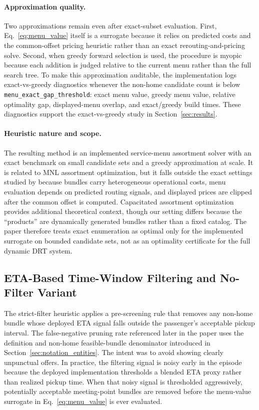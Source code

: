 \paragraph{Approximation quality.} Two approximations remain even after exact-subset evaluation. First, Eq.~\ref{eq:menu_value} itself is a surrogate because it relies on predicted costs and the common-offset pricing heuristic rather than an exact rerouting-and-pricing solve. Second, when greedy forward selection is used, the procedure is myopic because each addition is judged relative to the current menu rather than the full search tree. To make this approximation auditable, the implementation logs exact-vs-greedy diagnostics whenever the non-home candidate count is below \texttt{menu\_exact\_gap\_threshold}: exact menu value, greedy menu value, relative optimality gap, displayed-menu overlap, and exact/greedy build times. These diagnostics support the exact-vs-greedy study in Section~\ref{sec:results}.

\paragraph{Heuristic nature and scope.} The resulting method is an implemented service-menu assortment solver with an exact benchmark on small candidate sets and a greedy approximation at scale. It is related to MNL assortment optimization, but it falls outside the exact settings studied by \citet{wang2012} because bundles carry heterogeneous operational costs, menu evaluation depends on predicted routing signals, and displayed prices are clipped after the common offset is computed. Capacitated assortment optimization \citep{desir2022capacitated} provides additional theoretical context, though our setting differs because the ``products'' are dynamically generated bundles rather than a fixed catalog. The paper therefore treats exact enumeration as optimal only for the implemented surrogate on bounded candidate sets, not as an optimality certificate for the full dynamic DRT system.

\subsection{ETA-Based Time-Window Filtering and No-Filter Variant}
\label{sec:filtering}

The strict-filter heuristic applies a pre-screening rule that removes any non-home bundle whose deployed ETA signal falls outside the passenger's acceptable pickup interval. The false-negative pruning rate referenced later in the paper uses the definition and non-home feasible-bundle denominator introduced in Section~\ref{sec:notation_entities}. The intent was to avoid showing clearly unpunctual offers. In practice, the filtering signal is noisy early in the episode because the deployed implementation thresholds a blended ETA proxy rather than realized pickup time. When that noisy signal is thresholded aggressively, potentially acceptable meeting-point bundles are removed before the menu-value surrogate in Eq.~\ref{eq:menu_value} is ever evaluated.

